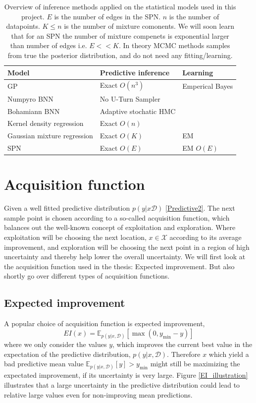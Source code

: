 \begin{table}[H]
    \centering
    \begin{tabular}{l|l|l}
    \textbf{Model}       & \textbf{Predictive inference}    &   \textbf{Learning} \\ \hline
    GP                          & Exact $O(n^3)$            & Emperical Bayes\\
    Numpyro BNN                 & No U-Turn Sampler         & \\
    Bohamiann BNN               & Adaptive stochatic HMC    & \\
    Kernel density regression   & Exact $O(n)$              & \\
    Gaussian mixture regression & Exact $O(K)$              & EM  \\
    SPN                         & Exact $O(E)$              &  EM $O(E)$\\
    \end{tabular}
    \caption{Overview of inference methods applied on the statistical models 
            used in this project. $E$ is the number of edges in the SPN. $n$ is the number of datapoints. 
            $K \leq n$ is the number of mixture comonents. We will soon learn that for an
            SPN the number of mixture compenets is exponential larger than number of edges
            i.e. $E << K$. In theory MCMC methods samples 
            from true the posterior distribution, and do not need any fitting/learning. 
            }
\end{table}


\section{Acquisition function}
Given a well fitted predictive distribution $p(y|x\mathcal{D})$ \eqref{Predictive2}. The next sample point is chosen
according to a so-called acquisition function, which balances out the well-known concept of
exploitation and exploration. Where exploitation will be choosing the next location, $x \in
\mathcal{X}$ according to its average improvement, and exploration will be choosing the next point
in a region of high uncertainty and thereby help lower the overall uncertainty. We will first look
at the acquisition function used in the thesis: Expected improvement. But also shortly
go over different types of acquisition functions. 

\subsection{Expected improvement}
A popular choice of acquisition function is expected improvement, 
$$EI(x) = \mathbb{E}_{p(y|x,\mathcal{D})}[\max(0, y_{\min}-y)]$$ where we only consider the values
$y$, which improves the current best value in the expectation of the predictive distribution,
$p(y|x,\mathcal{D})$. Therefore $x$ which yield a bad predictive mean value
$\mathbb{E}_{p(y|x,\mathcal{D})}[y]> y_{\min}$ might still be maximizing the expectated improvement,
if its uncertainty is very large. Figure \ref{EI_illustration} illustrates that a large uncertainty
in the predictive distribution could lead to relative large values even for non-improving mean
predictions.

